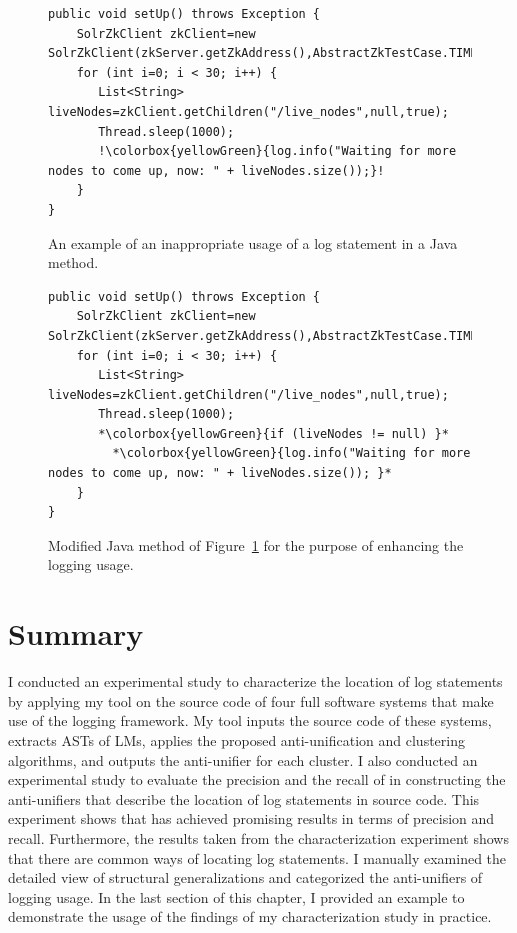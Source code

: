 \begin{figure}[p]
\def\baselinestretch{1}
\begin{lstlisting}[escapechar=!]
public void setUp() throws Exception {
    SolrZkClient zkClient=new SolrZkClient(zkServer.getZkAddress(),AbstractZkTestCase.TIMEOUT);
    for (int i=0; i < 30; i++) {
       List<String> liveNodes=zkClient.getChildren("/live_nodes",null,true);
       Thread.sleep(1000);
       !\colorbox{yellowGreen}{log.info("Waiting for more nodes to come up, now: " + liveNodes.size());}!
    }
}
\end{lstlisting}
\caption[Example 1: An example of an inappropriate usage of a log statement in a Java method.]{An example of an inappropriate usage of a log statement in a Java method.\label{inapproprate-ex1}}
\end{figure}



\begin{figure}[p]
\def\baselinestretch{1}
\begin{lstlisting}[escapechar=*]
public void setUp() throws Exception {
    SolrZkClient zkClient=new SolrZkClient(zkServer.getZkAddress(),AbstractZkTestCase.TIMEOUT);
    for (int i=0; i < 30; i++) {
       List<String> liveNodes=zkClient.getChildren("/live_nodes",null,true);
       Thread.sleep(1000);
       *\colorbox{yellowGreen}{if (liveNodes != null) }*
         *\colorbox{yellowGreen}{log.info("Waiting for more nodes to come up, now: " + liveNodes.size()); }*
    }
}
\end{lstlisting}
\caption[Example 1: An example  for the purpose of enhancing the logging usage in the Java method of Example.]{Modified Java method of Figure~\ref{inapproprate-ex1} for the purpose of enhancing the logging usage.\label{approprate-ex1}}
\end{figure}

\section{Summary}
I conducted an experimental study to characterize the location of log statements by applying my tool on the source code of four full software systems that make use of the  logging framework. My tool inputs the source code of these systems, extracts ASTs of LMs, applies the proposed anti-unification and clustering algorithms, and outputs the anti-unifier for each cluster. I also conducted an experimental study to evaluate the precision and the recall of  in constructing the anti-unifiers that describe the location of log statements in source code. This experiment shows that  has achieved promising results in terms of precision and recall. Furthermore, the results taken from the characterization experiment shows that there are common ways of locating log statements. I manually examined the detailed view of structural generalizations and categorized the anti-unifiers of logging usage. In the last section of this chapter, I provided an example to demonstrate the usage of the findings of my characterization study in practice.


